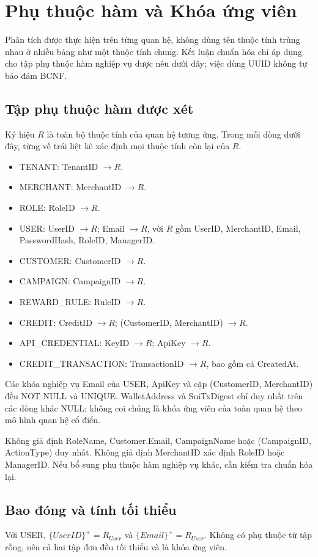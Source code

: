 \section{Phụ thuộc hàm và Khóa ứng viên}

Phân tích được thực hiện trên từng quan hệ, không dùng tên thuộc tính trùng nhau ở nhiều bảng như một thuộc tính chung. Kết luận chuẩn hóa chỉ áp dụng cho tập phụ thuộc hàm nghiệp vụ được nêu dưới đây; việc dùng UUID không tự bảo đảm BCNF.

\subsection{Tập phụ thuộc hàm được xét}
Ký hiệu $R$ là toàn bộ thuộc tính của quan hệ tương ứng. Trong mỗi dòng dưới đây, từng vế trái liệt kê xác định mọi thuộc tính còn lại của $R$.
\begin{itemize}
    \item TENANT: TenantID $\rightarrow R$.
    \item MERCHANT: MerchantID $\rightarrow R$.
    \item ROLE: RoleID $\rightarrow R$.
    \item USER: UserID $\rightarrow R$; Email $\rightarrow R$, với $R$ gồm UserID, MerchantID, Email, PasswordHash, RoleID, ManagerID.
    \item CUSTOMER: CustomerID $\rightarrow R$.
    \item CAMPAIGN: CampaignID $\rightarrow R$.
    \item REWARD\_RULE: RuleID $\rightarrow R$.
    \item CREDIT: CreditID $\rightarrow R$; (CustomerID, MerchantID) $\rightarrow R$.
    \item API\_CREDENTIAL: KeyID $\rightarrow R$; ApiKey $\rightarrow R$.
    \item CREDIT\_TRANSACTION: TransactionID $\rightarrow R$, bao gồm cả CreatedAt.
\end{itemize}
Các khóa nghiệp vụ Email của USER, ApiKey và cặp (CustomerID, MerchantID) đều NOT NULL và UNIQUE. WalletAddress và SuiTxDigest chỉ duy nhất trên các dòng khác NULL; không coi chúng là khóa ứng viên của toàn quan hệ theo mô hình quan hệ cổ điển.

Không giả định RoleName, Customer.Email, CampaignName hoặc (CampaignID, ActionType) duy nhất. Không giả định MerchantID xác định RoleID hoặc ManagerID. Nếu bổ sung phụ thuộc hàm nghiệp vụ khác, cần kiểm tra chuẩn hóa lại.

\subsection{Bao đóng và tính tối thiểu}
Với USER, $\{UserID\}^{+}=R_{User}$ và $\{Email\}^{+}=R_{User}$. Không có phụ thuộc từ tập rỗng, nên cả hai tập đơn đều tối thiểu và là khóa ứng viên.

